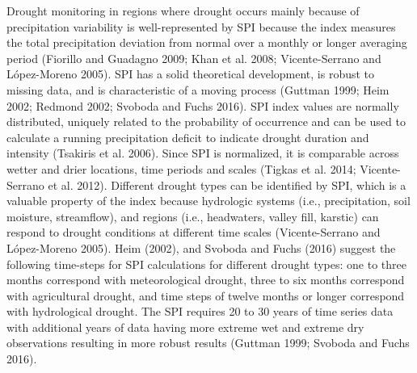 \documentclass[12pt,twoside]{reedthesis}
\theoremstyle{definition}
\theoremstyle{definition}
\theoremstyle{definition}
\theoremstyle{remark}
\begin{document}
Drought monitoring in regions where drought occurs mainly because of
precipitation variability is well-represented by SPI because the index
measures the total precipitation deviation from normal over a monthly or
longer averaging period (Fiorillo and Guadagno 2009; Khan et al. 2008;
Vicente-Serrano and López-Moreno 2005). SPI has a solid theoretical
development, is robust to missing data, and is characteristic of a
moving process (Guttman 1999; Heim 2002; Redmond 2002; Svoboda and Fuchs
2016). SPI index values are normally distributed, uniquely related to
the probability of occurrence and can be used to calculate a running
precipitation deficit to indicate drought duration and intensity
(Tsakiris et al. 2006). Since SPI is normalized, it is comparable across
wetter and drier locations, time periods and scales (Tigkas et al. 2014;
Vicente-Serrano et al. 2012). Different drought types can be identified
by SPI, which is a valuable property of the index because hydrologic
systems (i.e., precipitation, soil moisture, streamflow), and regions
(i.e., headwaters, valley fill, karstic) can respond to drought
conditions at different time scales (Vicente-Serrano and López-Moreno
2005). Heim (2002), and Svoboda and Fuchs (2016) suggest the following
time-steps for SPI calculations for different drought types: one to
three months correspond with meteorological drought, three to six months
correspond with agricultural drought, and time steps of twelve months or
longer correspond with hydrological drought. The SPI requires 20 to 30
years of time series data with additional years of data having more
extreme wet and extreme dry observations resulting in more robust
results (Guttman 1999; Svoboda and Fuchs 2016).
\end{document}
